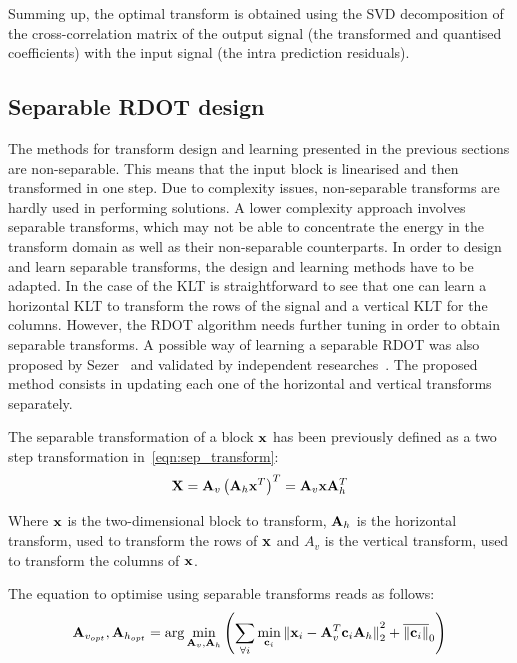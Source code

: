 \documentclass[11pt,a4paper,openright,twoside]{book}
\numberwithin{equation}{section} %
\numberwithin{figure}{section} %
\numberwithin{table}{section} %
\begin{document}
Summing up, the optimal transform is obtained using the SVD decomposition of
the cross-correlation matrix of the output signal (the transformed and
quantised coefficients) with the input signal (the intra prediction
residuals).

\subsection{Separable \ac{RDOT} design}
\label{sub:separable_rdot_design}

The methods for transform design and learning presented in the previous
sections are non-separable.
This means that the input block is linearised and then transformed in
one step.
Due to complexity issues, non-separable transforms are hardly used in
performing solutions.
A lower complexity approach involves separable transforms, which may not be
able to concentrate the energy in the transform domain as well as their
non-separable counterparts.
In order to design and learn separable transforms, the design and learning
methods have to be adapted.
In the case of the \ac{KLT} is straightforward to see that one can learn
a horizontal \ac{KLT} to transform the rows of the signal and a vertical
\ac{KLT} for the columns.
However, the \ac{RDOT} algorithm needs further tuning in order to obtain
separable transforms.
A possible way of learning a separable \ac{RDOT} was also proposed by
Sezer~\cite{sezer-11-phd} and validated by independent
researches~\cite{sole-09-sparsity-optimisation-separable-transforms}.
The proposed method consists in updating each one of the horizontal and
vertical transforms separately.

The separable transformation of a block $\mathbf{x}$ has been previously defined as a
two step transformation in~\eqref{eqn:sep_transform}:
\begin{equation*}
  \mathbf{X} = {\mathbf{A}_v\left( \mathbf{A}_h \mathbf{x}^T \right)}^T = \mathbf{A}_v \mathbf{x} \mathbf{A}_h^T
\end{equation*}

Where $\mathbf{x}$ is the two-dimensional block to transform, $\mathbf{A}_h$ is the horizontal
transform, used to transform the rows of $\mathbf{x}$ and $A_v$ is the vertical
transform, used to transform the columns of $\mathbf{x}$.

The equation to optimise using separable transforms reads as follows:
\begin{equation}
  \mathbf{A}_{v_{opt}}, \mathbf{A}_{h_{opt}} = \text{arg}\min\limits_{\mathbf{A}_v,\mathbf{A}_h}
  \left(
  \sum_{\forall i} \min\limits_{\mathbf{c}_i}{\Vert \mathbf{x}_i - \mathbf{A}_v^T\mathbf{c}_i\mathbf{A}_h \Vert}_2^2
  + \overline{\Vert \mathbf{c}_i \Vert}_0
  \right)
\end{equation}
\end{document}
